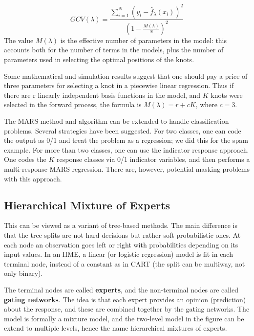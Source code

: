 \documentclass[12pt, letterpaper]{article}
\theoremstyle{definition}
\begin{document}
\begin{equation}
GCV(\lambda) = \frac{\sum_{i=1}^N (y_i - \hat{f}_\lambda(x_i))^2}{(1-\frac{M(\lambda)}{N})^2}
\end{equation}
The value $M(\lambda)$ is the effective number of parameters in the model: this accounts both for the number of terms in the models, plus the number of parameters used in selecting the optimal positions of the knots.

Some mathematical and simulation results suggest that one should pay a price of three parameters for selecting a knot in a piecewise linear regression.
Thus if there are r linearly independent basis functions in the model, and $K$ knots were selected in the forward process, the formula is $M(\lambda) = r+cK$, where $c = 3$.

The MARS method and algorithm can be extended to handle classification problems. Several strategies have been suggested. For two classes, one can code the output as 0/1 and treat the problem as a regression; we did this for the spam example. For more than two classes, one can use the indicator response approach. One codes the $K$ response classes via 0/1 indicator variables, and then performs a multi-response MARS regression. There are, however, potential masking problems with this approach.

\subsection{Hierarchical Mixture of Experts}
This can be viewed as a variant of tree-based methods. The main difference is that the tree splits are not hard decisions but rather soft probabilistic ones. At each node an observation goes left or right with probabilities depending on its input values. In an HME, a linear (or logistic regression) model is fit in each terminal node, instead of a constant as in CART (the split can be multiway, not only binary).

The terminal nodes are called \textbf{experts}, and the non-terminal nodes are called \textbf{gating networks}. The idea is that each expert provides an opinion (prediction) about the response, and these are combined together by the gating networks. The model is formally a mixture model, and the two-level model in the figure can be extend to multiple levels, hence the name hierarchical mixtures of experts.
\end{document}
